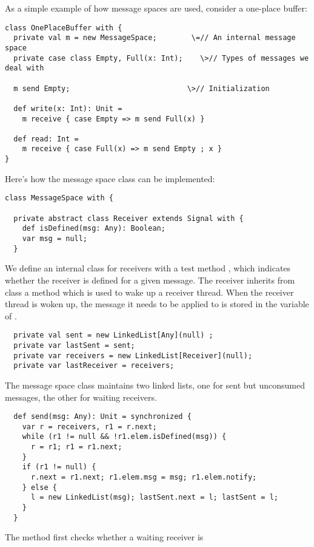 \documentclass[11pt]{report}
\begin{document}
As a simple example of how message spaces are used, consider a
one-place buffer:
\begin{verbatim}
class OnePlaceBuffer with {
  private val m = new MessageSpace;        \=// An internal message space
  private case class Empty, Full(x: Int);    \>// Types of messages we deal with

  m send Empty;                           \>// Initialization

  def write(x: Int): Unit =
    m receive { case Empty => m send Full(x) }

  def read: Int =
    m receive { case Full(x) => m send Empty ; x }
}
\end{verbatim}
Here's how the message space class can be implemented:
\begin{verbatim}
class MessageSpace with {

  private abstract class Receiver extends Signal with {
    def isDefined(msg: Any): Boolean;
    var msg = null;
  }
\end{verbatim}
We define an internal class for receivers with a test method
\verb@isDefined@, which indicates whether the receiver is
defined for a given message.  The receiver inherits from class
\verb@Signal@ a \verb@notify@ method which is used to wake up a
receiver thread. When the receiver thread is woken up, the message it
needs to be applied to is stored in the \verb@msg@ variable of
\verb@Receiver@.
\begin{verbatim}
  private val sent = new LinkedList[Any](null) ;
  private var lastSent = sent;
  private var receivers = new LinkedList[Receiver](null);
  private var lastReceiver = receivers;
\end{verbatim}
The message space class maintains two linked lists,
one for sent but unconsumed messages, the other for waiting receivers.
\begin{verbatim}
  def send(msg: Any): Unit = synchronized {
    var r = receivers, r1 = r.next;
    while (r1 != null && !r1.elem.isDefined(msg)) {
      r = r1; r1 = r1.next;
    }
    if (r1 != null) {
      r.next = r1.next; r1.elem.msg = msg; r1.elem.notify;
    } else {
      l = new LinkedList(msg); lastSent.next = l; lastSent = l;
    }
  }
\end{verbatim}
The \verb@send@ method first checks whether a waiting receiver is
\end{document}
